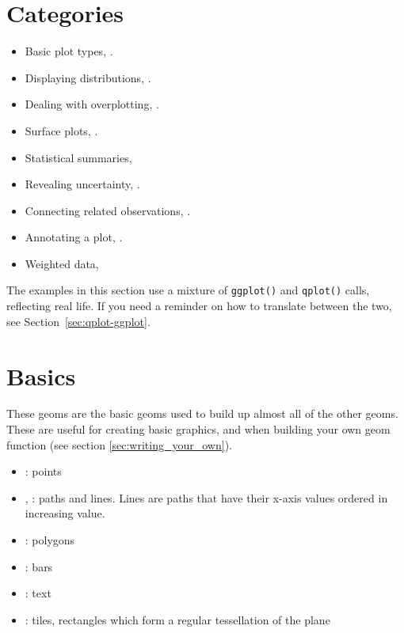 \section{Categories}
\label{sec:categories}

\begin{itemize}
  \item Basic plot types, .
  \item Displaying distributions, .
  \item Dealing with overplotting, .
  \item Surface plots, .
  \item Statistical summaries, 
  \item Revealing uncertainty, .
  \item Connecting related observations, .
  \item Annotating a plot, .
  \item Weighted data, 
\end{itemize}

The examples in this section use a mixture of {\tt ggplot()} and {\tt qplot()} calls, reflecting real life.  If you need a reminder on how to translate between the two, see Section~\ref{sec:qplot-ggplot}.

\section{Basics}\label{sec:basics}

These geoms are the basic geoms used to build up almost all of the other geoms.  These are useful for creating basic graphics, and when building your own geom function (see section \ref{sec:writing_your_own}).

\begin{itemize}
  \item {}: points
  \item {}, : paths and lines.  Lines are paths that have their x-axis values ordered in increasing value.
  \item {}: polygons
  \item {}: bars
  \item {}: text
  \item {}: tiles, rectangles which form a regular tessellation of the plane
\end{itemize}

